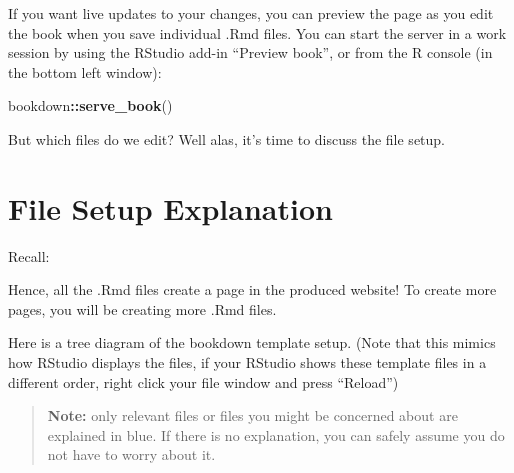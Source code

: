 \documentclass[
]{book}
\newenvironment{Shaded}{\begin{snugshade}}{\end{snugshade}}
\newcommand{\FunctionTok}[1]{\textcolor[rgb]{0.13,0.29,0.53}{\textbf{#1}}}
\newcommand{\NormalTok}[1]{#1}
\newcommand{\SpecialCharTok}[1]{\textcolor[rgb]{0.81,0.36,0.00}{\textbf{#1}}}
\theoremstyle{definition}
\theoremstyle{definition}
\theoremstyle{definition}
\theoremstyle{definition}
\theoremstyle{remark}
\begin{document}
If you want live updates to your changes, you can preview the page as you edit the book when you save individual .Rmd files. You can start the server in a work session by using the RStudio add-in ``Preview book'', or from the R console (in the bottom left window):

\begin{Shaded}
\begin{Highlighting}[]
\NormalTok{bookdown}\SpecialCharTok{::}\FunctionTok{serve\_book}\NormalTok{()}
\end{Highlighting}
\end{Shaded}

But which files do we edit? Well alas, it's time to discuss the file setup.

\section{File Setup Explanation}\label{file-setup}

Recall:

Hence, all the .Rmd files create a page in the produced website! To create more pages, you will be creating more .Rmd files.

Here is a tree diagram of the bookdown template setup. (Note that this mimics how RStudio displays the files, if your RStudio shows these template files in a different order, right click your file window and press ``Reload'')

\begin{quote}
\textbf{Note:} only relevant files or files you might be concerned about are explained in blue. If there is no explanation, you can safely assume you do not have to worry about it.
\end{quote}
\end{document}
